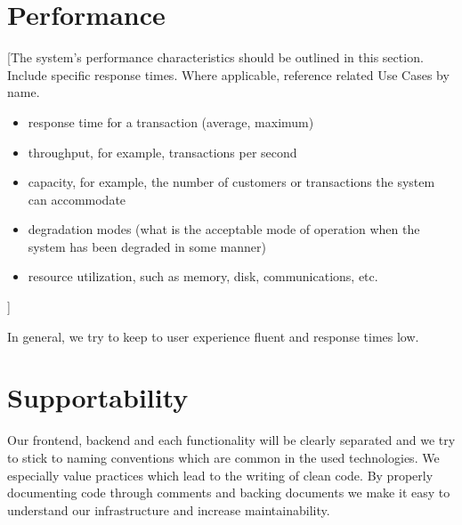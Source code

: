 \documentclass[a4paper,12pt,chapterprefix=false,bibliography=totoc,listof=totoc,]{scrreprt}
\begin{document}
\section{{\color{blue} Performance}}
{\color{blue} [The system’s performance characteristics should be outlined in this section. Include specific response times. Where applicable, reference related Use Cases by name.
 \begin{itemize}
 	\item response time for a transaction (average, maximum)
 	\item throughput, for example, transactions per second
 	\item capacity, for example, the number of customers or transactions the system can accommodate
	\item degradation modes (what is the acceptable mode of operation when the system has been degraded in some manner)
	\item resource utilization, such as memory, disk, communications, etc.
 \end{itemize}]}

{\color{magenta}
In general, we try to keep to user experience fluent and response times low.
}


\section{{\color{magenta} Supportability}}
{\color{magenta}
Our frontend, backend and each functionality will be clearly separated and we try to stick to naming conventions which are common in the used technologies. We especially value practices which lead to the writing of clean code. By properly documenting code through comments and backing documents we make it easy to understand our infrastructure and increase maintainability.
}

\end{document}
